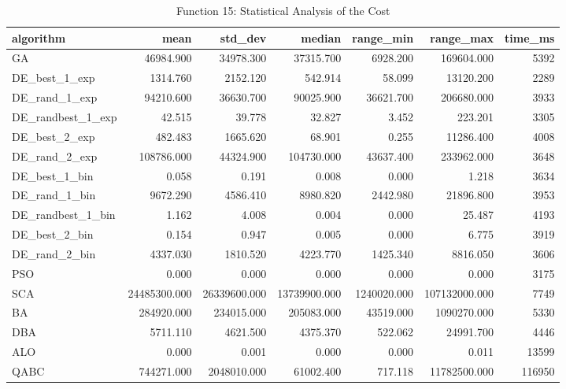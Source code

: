 \documentclass[12pt]{article}
\begin{document}
\begin{table}[H]
    \centering
    \footnotesize
    \begin{adjustbox}{width=1\textwidth}
\begin{tabular}{lrrrrrr}
\toprule
         algorithm &         mean &      std\_dev &       median &   range\_min &     range\_max &  time\_ms \\
\midrule
                GA &    46984.900 &    34978.300 &    37315.700 &    6928.200 &    169604.000 &     5392 \\
     DE\_best\_1\_exp &     1314.760 &     2152.120 &      542.914 &      58.099 &     13120.200 &     2289 \\
     DE\_rand\_1\_exp &    94210.600 &    36630.700 &    90025.900 &   36621.700 &    206680.000 &     3933 \\
 DE\_randbest\_1\_exp &       42.515 &       39.778 &       32.827 &       3.452 &       223.201 &     3305 \\
     DE\_best\_2\_exp &      482.483 &     1665.620 &       68.901 &       0.255 &     11286.400 &     4008 \\
     DE\_rand\_2\_exp &   108786.000 &    44324.900 &   104730.000 &   43637.400 &    233962.000 &     3648 \\
     DE\_best\_1\_bin &        0.058 &        0.191 &        0.008 &       0.000 &         1.218 &     3634 \\
     DE\_rand\_1\_bin &     9672.290 &     4586.410 &     8980.820 &    2442.980 &     21896.800 &     3953 \\
 DE\_randbest\_1\_bin &        1.162 &        4.008 &        0.004 &       0.000 &        25.487 &     4193 \\
     DE\_best\_2\_bin &        0.154 &        0.947 &        0.005 &       0.000 &         6.775 &     3919 \\
     DE\_rand\_2\_bin &     4337.030 &     1810.520 &     4223.770 &    1425.340 &      8816.050 &     3606 \\
               PSO &        0.000 &        0.000 &        0.000 &       0.000 &         0.000 &     3175 \\
               SCA & 24485300.000 & 26339600.000 & 13739900.000 & 1240020.000 & 107132000.000 &     7749 \\
                BA &   284920.000 &   234015.000 &   205083.000 &   43519.000 &   1090270.000 &     5330 \\
               DBA &     5711.110 &     4621.500 &     4375.370 &     522.062 &     24991.700 &     4446 \\
               ALO &        0.000 &        0.001 &        0.000 &       0.000 &         0.011 &    13599 \\
              QABC &   744271.000 &  2048010.000 &    61002.400 &     717.118 &  11782500.000 &   116950 \\
\bottomrule
\end{tabular}


    \end{adjustbox}
    \caption{Function 15: Statistical Analysis of the Cost} 
    \end{table}
\end{document}

